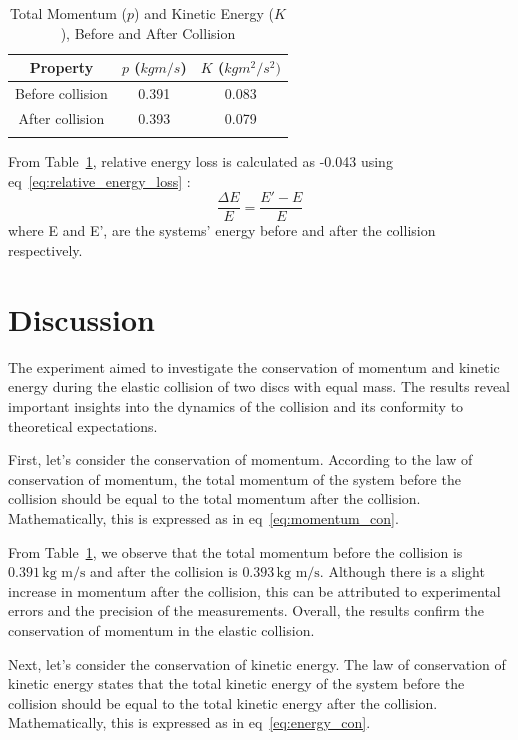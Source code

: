 \documentclass[journal]{IEEEtran}
\begin{document}
\begin{table}[h]
    \centering
    \begin{tabular}{ccc}
        \hline
        Property  & $p$ ($kg m/s$)& $K$ ($kg {m^2}/{s^2})$\\
        \hline
        Before collision & 0.391 & 0.083 \\
        After collision & 0.393 & 0.079 \\
        \hline \\
    \end{tabular}
    \caption{Total Momentum ($p$) and Kinetic Energy ($K$), Before and After Collision }
    \label{tab:Befor_After}
\end{table}

From Table~\ref{tab:Befor_After}, relative energy loss is calculated as -0.043 using eq~\ref{eq:relative_energy_loss} \cite{colabnotebook}:
\begin{equation}
    \frac{\Delta E }{E} = \frac{E'- E}{E}
    \label{eq:relative_energy_loss}
\end{equation}
where E and E', are the systems' energy before and after the collision respectively.


\section{Discussion}
The experiment aimed to investigate the conservation of momentum and kinetic energy during the elastic collision of two discs with equal mass. The results reveal important insights into the dynamics of the collision and its conformity to theoretical expectations.

First, let's consider the conservation of momentum. According to the law of conservation of momentum, the total momentum of the system before the collision should be equal to the total momentum after the collision. Mathematically, this is expressed as in eq~\ref{eq:momentum_con}.

From Table~\ref{tab:Befor_After}, we observe that the total momentum before the collision is $0.391 \, \text{kg m/s}$ and after the collision is $0.393 \, \text{kg m/s}$. Although there is a slight increase in momentum after the collision, this can be attributed to experimental errors and the precision of the measurements. Overall, the results confirm the conservation of momentum in the elastic collision.

Next, let's consider the conservation of kinetic energy. The law of conservation of kinetic energy states that the total kinetic energy of the system before the collision should be equal to the total kinetic energy after the collision. Mathematically, this is expressed as in eq~\ref{eq:energy_con}.
\end{document}
